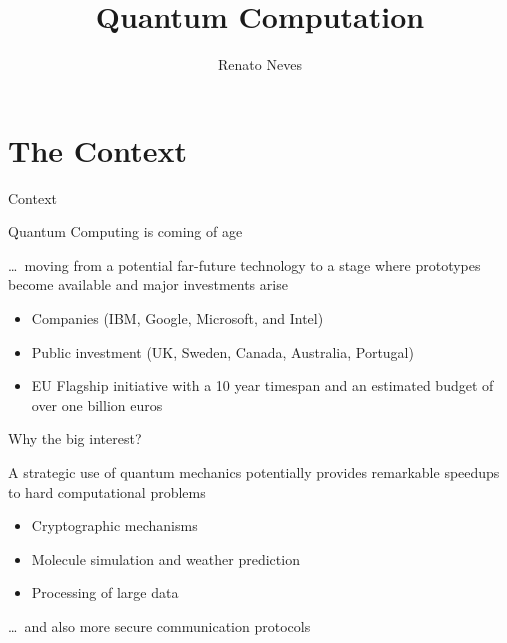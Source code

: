 \documentclass{beamer}
\author[Renato Neves]{Renato Neves}
\date{}
\begin{document}
\title{Quantum Computation}

\frame[plain]{\titlepage}

\section{The Context}

\begin{frame}{Context}

  Quantum Computing is coming of age

  \dots\ moving from a potential far-future technology
  to a stage where prototypes become available and
  \alert{major investments} arise
  \begin{itemize}
  \item Companies (IBM, Google, Microsoft, and Intel)
  \item Public investment (UK, Sweden, Canada, Australia, Portugal)
  \item EU Flagship initiative with a 10 year timespan and an
  estimated budget of over one billion euros
  \end{itemize}
\end{frame}

\begin{frame}{Why the big interest?}
        
  A strategic use of quantum mechanics potentially provides remarkable speedups
  to hard \alert{computational} problems

  \begin{itemize}
  \item Cryptographic mechanisms
  \item Molecule simulation and weather prediction
  \item Processing of large data
  \end{itemize}

  \dots\ and also more secure \alert{communication protocols}
\end{frame}
\end{document}
